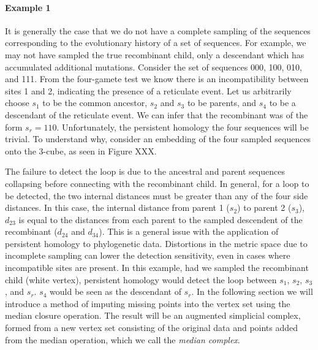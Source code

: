 \paragraph{Example 1}
\label{ex:example1}
%
It is generally the case that we do not have a complete sampling of the sequences corresponding to the evolutionary history of a set of sequences.
For example, we may not have sampled the true recombinant child, only a descendant which has accumulated additional mutations.
Consider the set of sequences 000, 100, 010, and 111.
From the four-gamete test we know there is an incompatibility between sites 1 and 2, indicating the presence of a reticulate event.
Let us arbitrarily choose $s_1$ to be the common ancestor, $s_2$ and $s_3$ to be parents, and $s_4$ to be a descendant of the reticulate event.
We can infer that the recombinant was of the form $s_r=110$.
Unfortunately, the persistent homology the four sequences will be trivial.
To understand why, consider an embedding of the four sampled sequences onto the 3-cube, as seen in Figure XXX.

The failure to detect the loop is due to the ancestral and parent sequences collapsing before connecting with the recombinant child.
In general, for a loop to be detected, the two internal distances must be greater than any of the four side distances.
In this case, the internal distance from parent 1 ($s_2$) to parent 2 ($s_3$), $d_{23}$ is equal to the distances from each parent to the sampled descendent of the recombinant ($d_{24}$ and $d_{34}$).
This is a general issue with the application of persistent homology to phylogenetic data.
Distortions in the metric space due to incomplete sampling can lower the detection sensitivity, even in cases where incompatible sites are present.
In this example, had we sampled the recombinant child (white vertex), persistent homology would detect the loop between $s_1$, $s_2$, $s_3$, and $s_r$.
$s_4$ would be seen as the descendant of $s_r$.
In the following section we will introduce a method of imputing missing points into the vertex set using the median closure operation.
The result will be an augmented simplicial complex, formed from a new vertex set consisting of the original data and points added from the median operation, which we call the \emph{median complex}.

